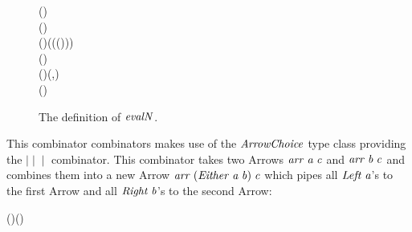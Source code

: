 \documentclass[paper=A4,twoside=true,openright,parskip=full,chapterprefix=true,headings=normal,bibliography=totoc,listof=totoc,titlepage=on,captions=tableabove,draft=false,british]{scrreprt}%
\begin{document}
\begin{figure}[h]
\centering
\begin{hscode}\SaveRestoreHook
{}%
%
%
%
%
\>[B]{}\mathbin{::}(\;)\to {}\<[E]%
\\
\>[B]{}\;(\mathbin{:})\mathrel{=}\;\mathbin{>\!\!>\!\!>}{}\<[E]%
\\
\>[B]{}\<[10]%
\>[10]{}\;()\mathbin{\mid\!\mid\!\mid}(\mathbin{*\!*\!*}\;\mathbin{>\!\!>\!\!>}\;(\;(\mathbin{:}))){}\<[E]%
\\
\>[B]{}\<[10]%
\>[10]{}\;\<[32]%
\>[32]{}\mathrel{=}\;(){}\<[E]%
\\
\>[10]{}\<[16]%
\>[16]{}\;(\mathbin{:})\mathrel{=}\;(,){}\<[E]%
\\
\>[B]{}\mathrel{=}\;(){}\<[E]%
\ColumnHook
\end{hscode}\resethooks
\caption{The definition of \ensuremath{\Varid{evalN}}.}\label{fig:evalN}\end{figure}

This combinator combinators makes use of the \ensuremath{\Conid{ArrowChoice}} type class
providing the \ensuremath{\mathbin{\mid\!\mid\!\mid}} combinator. This combinator takes two
Arrows \ensuremath{\Varid{arr}\;\Varid{a}\;\Varid{c}} and \ensuremath{\Varid{arr}\;\Varid{b}\;\Varid{c}} and combines them into a new Arrow
\ensuremath{\Varid{arr}\;(\Conid{Either}\;\Varid{a}\;\Varid{b})\;\Varid{c}} which pipes all \ensuremath{\Conid{Left}\;\Varid{a}}'s to the first Arrow and
all \ensuremath{\Conid{Right}\;\Varid{b}}'s to the second Arrow:


\begin{hscode}\SaveRestoreHook
{}%
%
\>[B]{}(\mathbin{\mid\!\mid\!\mid})\mathbin{::}\;\Rightarrow {}\;\;\to {}\;\;\to {}\;(\;\;)\;\<[E]%
\ColumnHook
\end{hscode}\resethooks
\vspace{-2\baselineskip}
\end{document}
